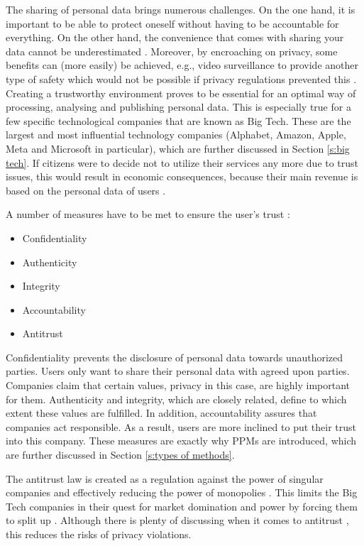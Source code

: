 The sharing of personal data brings numerous challenges. 
On the one hand, it is important to be able to protect oneself without having to be accountable for everything. 
On the other hand, the convenience that comes with sharing your data cannot be underestimated \cite{Hist2007}. 
Moreover, by encroaching on privacy, some benefits can (more easily) be achieved, e.g., video surveillance to provide another type of safety which would not be possible if privacy regulations prevented this \cite{Hist2007}.
Creating a trustworthy environment proves to be essential for an optimal way of processing, analysing and publishing personal data. 
This is especially true for a few specific technological companies that are known as Big Tech. These are the largest and most influential technology companies (Alphabet, Amazon, Apple, Meta and Microsoft in particular), which are further discussed in Section \ref{s:big tech}.
If citizens were to decide not to utilize their services any more due to trust issues, this would result in economic consequences, because their main revenue is based on the personal data of users \cite{Dinev2014}. 

A number of measures have to be met to ensure the user's trust \cite{8906}:

\begin{itemize}
    \item Confidentiality
    \item Authenticity
    \item Integrity
    \item Accountability
    \item Antitrust
\end{itemize}

Confidentiality prevents the disclosure of personal data towards unauthorized parties. 
Users only want to share their personal data with agreed upon parties.
Companies claim that certain values, privacy in this case, are highly important for them. 
Authenticity and integrity, which are closely related, define to which extent these values are fulfilled. 
In addition, accountability assures that companies act responsible. As a result, users are more inclined to put their trust into this company. These measures are exactly why \gls{PPM}s are introduced, which are further discussed in Section \ref{s:types of methods}.

The antitrust law is created as a regulation against the power of singular companies and effectively reducing the power of monopolies \cite{Hart2001}.
This limits the Big Tech companies in their quest for market domination and power by forcing them to split up \cite{Creser2021}. 
Although there is plenty of discussing when it comes to antitrust \cite{Fukuyama2021, Ghosh2021}, this reduces the risks of privacy violations.

